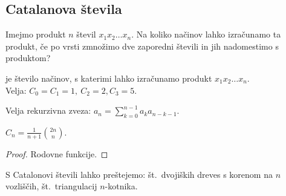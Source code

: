 \subsection{Catalanova števila}
Imejmo produkt $n$ števil $x_1x_2 \ldots x_n$. Na koliko načinov lahko izračunamo ta produkt, če po vrsti zmnožimo dve zaporedni števili in jih nadomestimo s produktom?

\begin{definicija}
     je število načinov, s katerimi lahko izračunamo produkt $x_1x_2 \ldots x_n$. \\ Velja: \(C_0 = C_1 = 1, \ C_2 = 2, C_3 = 5\).
\end{definicija}

\begin{trditev}
    Velja rekurzivna zveza: $a_n = \sum_{k=0}^{n-1}a_ka_{n-k-1}$.
\end{trditev}

\begin{trditev}
    $C_n = \frac{1}{n+1} \binom{2n}{n}$.
\end{trditev}

\begin{proof}
    Rodovne funkcije.
\end{proof}

\begin{primer}
    S Catalonovi števili lahko preštejemo: št.\ dvojiških dreves s korenom na \(n\) vozliščih, št.\ triangulacij \(n\)-kotnika.
\end{primer}
